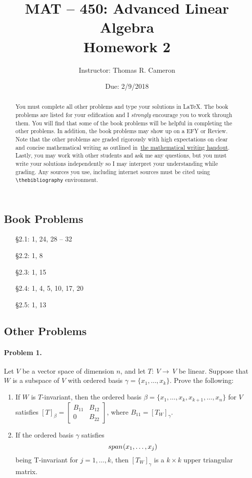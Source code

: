 \documentclass{article}
\title{MAT -- 450: Advanced Linear Algebra\\
\large{Homework 2}}
\author{Instructor: Thomas R. Cameron}
\date{Due: 2/9/2018}
\newcommand{\spn}{{span\mkern1mu}}
\begin{document}
\maketitle

\begin{abstract}
You must complete all other problems and type your solutions in \LaTeX. The book problems are listed for your edification and I \emph{strongly} encourage you to work through them. You will find that some of the book problems will be helpful in completing the other problems. In addition, the book problems may show up on a EFY or Review. Note that the other problems are graded rigorously with high expectations on clear and concise mathematical writing as outlined in~\href{https://www.thomasrcameron.com/courses/MAT-450/handouts/math_writing.pdf}{the mathematical writing handout}. Lastly, you may work with other students and ask me any questions, but you must write your solutions independently so I may interpret your understanding while grading. Any sources you use, including internet sources must be cited using {\verb+\thebibliography+} environment. 
\end{abstract}

\subsection*{Book Problems}
\begin{itemize}
\item   [\S 2.1:] 1, 24, 28 -- 32
\item   [\S 2.2:] 1, 8
\item   [\S 2.3:] 1, 15
\item   [\S 2.4:] 1, 4, 5, 10, 17, 20
\item   [\S 2.5:] 1, 13
\end{itemize}

\subsection*{Other Problems}

\paragraph*{Problem 1.} Let $V$ be a vector space of dimension $n$, and let $T\colon~V\rightarrow~V$ be linear. Suppose that $W$ is a subspace of $V$ with ordered basis $\gamma=\{x_{1},\ldots,x_{k}\}$. Prove the following:
\begin{enumerate}[(i.)]
\item	If $W$ is $T$-invariant, then the ordered basis $\beta=\{x_{1},\ldots,x_{k},x_{k+1},\ldots,x_{n}\}$ for $V$ satisfies $[T]_{\beta}=\begin{bmatrix}B_{11} & B_{12}\\ 0 & B_{22}\end{bmatrix}$, where $B_{11}=[T_{W}]_{\gamma}$. 
\item	If the ordered basis $\gamma$ satisfies 
\[
\spn(x_{1},\ldots,x_{j})
\]
being T-invariant for $j=1,\ldots,k$, then $[T_{W}]_{\gamma}$ is a $k\times k$ upper triangular matrix. 
\end{enumerate}
\end{document}
